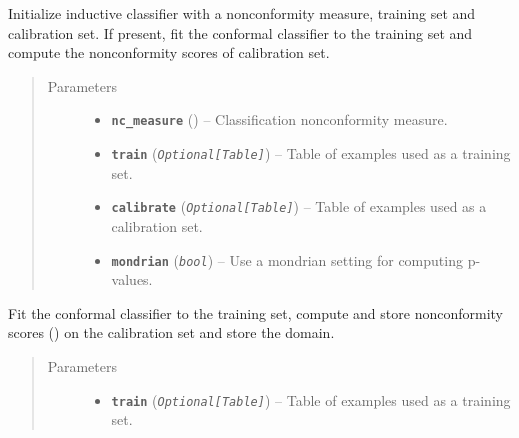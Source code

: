 \documentclass[letterpaper,10pt,english]{sphinxmanual}
\begin{document}
\begin{fulllineitems}
\begin{fulllineitems}
\label{cp.classification:cp.classification.InductiveClassifier.__init__}
Initialize inductive classifier with a nonconformity measure, training set and calibration set.
If present, fit the conformal classifier to the training set and compute the nonconformity scores of
calibration set.
\begin{quote}\begin{description}
\item[{Parameters}] \leavevmode\begin{itemize}
\item {} 
\textbf{\texttt{nc\_measure}} ({\hyperref[cp.nonconformity:cp.nonconformity.ClassNC]{}}) -- Classification nonconformity measure.

\item {} 
\textbf{\texttt{train}} (\emph{\texttt{Optional{[}Table{]}}}) -- Table of examples used as a training set.

\item {} 
\textbf{\texttt{calibrate}} (\emph{\texttt{Optional{[}Table{]}}}) -- Table of examples used as a calibration set.

\item {} 
\textbf{\texttt{mondrian}} (\emph{\texttt{bool}}) -- Use a mondrian setting for computing p-values.

\end{itemize}

\end{description}\end{quote}

\end{fulllineitems}


\begin{fulllineitems}
\label{cp.classification:cp.classification.InductiveClassifier.fit}
Fit the conformal classifier to the training set, compute and store nonconformity scores ({\hyperref[cp.classification:cp.classification.InductiveClassifier.alpha]{}})
on the calibration set and store the domain.
\begin{quote}\begin{description}
\item[{Parameters}] \leavevmode\begin{itemize}
\item {} 
\textbf{\texttt{train}} (\emph{\texttt{Optional{[}Table{]}}}) -- Table of examples used as a training set.


\end{itemize}
\end{description}
\end{quote}
\end{fulllineitems}
\end{fulllineitems}
\end{document}
